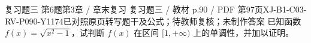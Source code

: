 \par\noindent\begin{minipage}{\linewidth}
\begin{bankitem}{复习题三 第6题}{第3章 / 章末复习 复习题三 / 教材 p.90 / PDF 第97页}{XJ-B1-C03-RV-P090-Y1174}{已对照原页转写题干及公式；待教师复核；未制作答案}
已知函数 $f(x)=\sqrt{x^2-1}$，试判断 $f(x)$ 在区间 $[1,+\infty)$ 上的单调性，并加以证明。
\end{bankitem}
\end{minipage}\par\medskip
